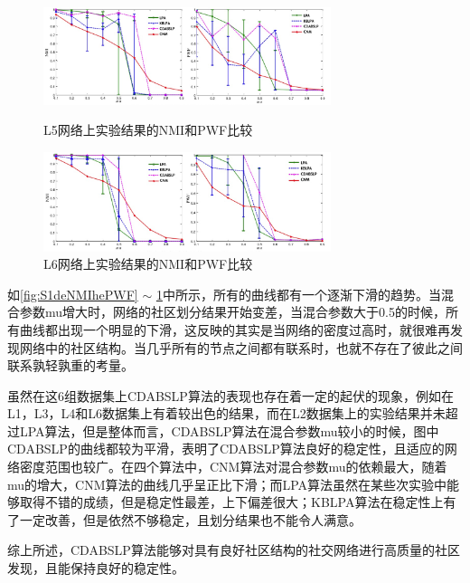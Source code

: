 \begin{figure}
  \centering
  \includegraphics[width=0.75\textwidth]{figures/S5deNMIhePWF}
  \caption{L5网络上实验结果的NMI和PWF比较}\label{fig:S5deNMIhePWF}

  \includegraphics[width=0.75\textwidth]{figures/S6deNMIhePWF}
  \caption{L6网络上实验结果的NMI和PWF比较}\label{fig:S6deNMIhePWF}
\end{figure}

如\ref{fig:S1deNMIhePWF} $\sim$ \ref{fig:S6deNMIhePWF}中所示，所有的曲线都有一个逐渐下滑的趋势。当混合参数mu增大时，网络的社区划分结果开始变差，当混合参数大于0.5的时候，所有曲线都出现一个明显的下滑，这反映的其实是当网络的密度过高时，就很难再发现网络中的社区结构。当几乎所有的节点之间都有联系时，也就不存在了彼此之间联系孰轻孰重的考量。

虽然在这6组数据集上CDABSLP算法的表现也存在着一定的起伏的现象，例如在L1，L3，L4和L6数据集上有着较出色的结果，而在L2数据集上的实验结果并未超过LPA算法，但是整体而言，CDABSLP算法在混合参数mu较小的时候，图中CDABSLP的曲线都较为平滑，表明了CDABSLP算法良好的稳定性，且适应的网络密度范围也较广。在四个算法中，CNM算法对混合参数mu的依赖最大，随着mu的增大，CNM算法的曲线几乎呈正比下滑；而LPA算法虽然在某些次实验中能够取得不错的成绩，但是稳定性最差，上下偏差很大；KBLPA算法在稳定性上有了一定改善，但是依然不够稳定，且划分结果也不能令人满意。

综上所述，CDABSLP算法能够对具有良好社区结构的社交网络进行高质量的社区发现，且能保持良好的稳定性。

